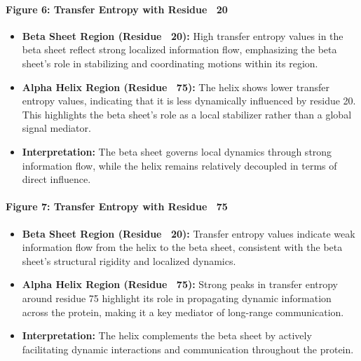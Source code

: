 \documentclass[English, Lau, oneside]{sapthesis}
\begin{document}
\begin{itemize}
\paragraph{Figure 6: Transfer Entropy with Residue ~20}
\begin{itemize}
    \item \textbf{Beta Sheet Region (Residue ~20):} High transfer entropy values in the beta sheet reflect strong localized information flow, emphasizing the beta sheet's role in stabilizing and coordinating motions within its region.
    \item \textbf{Alpha Helix Region (Residue ~75):} The helix shows lower transfer entropy values, indicating that it is less dynamically influenced by residue 20. This highlights the beta sheet's role as a local stabilizer rather than a global signal mediator.
    \item \textbf{Interpretation:} The beta sheet governs local dynamics through strong information flow, while the helix remains relatively decoupled in terms of direct influence.
\end{itemize}

\paragraph{Figure 7: Transfer Entropy with Residue ~75}
\begin{itemize}
    \item \textbf{Beta Sheet Region (Residue ~20):} Transfer entropy values indicate weak information flow from the helix to the beta sheet, consistent with the beta sheet's structural rigidity and localized dynamics.
    \item \textbf{Alpha Helix Region (Residue ~75):} Strong peaks in transfer entropy around residue 75 highlight its role in propagating dynamic information across the protein, making it a key mediator of long-range communication.
    \item \textbf{Interpretation:} The helix complements the beta sheet by actively facilitating dynamic interactions and communication throughout the protein.
\end{itemize}


\end{itemize}
\end{document}
